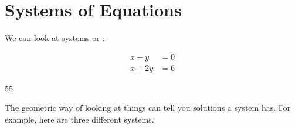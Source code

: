 \section{Systems of Equations}

We can look at systems
 or :

\vspace{1\baselineskip}
\noindent
\begin{minipage}{0.45\textwidth}
    \begin{center}
        \large
        \begin{align*}
            x - y &= 0 \\
            x + 2y &= 6 
        \end{align*}
    \end{center}
\end{minipage}
%
\hfil 
%
\begin{minipage}{0.45\textwidth}
    \begin{center}
        \begin{myTikzpictureGrid}{0.25} {5}{5}
            \end{myTikzpictureGrid}
    \end{center}
\end{minipage}

\vspace{1\baselineskip}
\noindent 
The geometric way of looking at things can tell you  solutions 
a system has. 
For example, here are three different systems.

